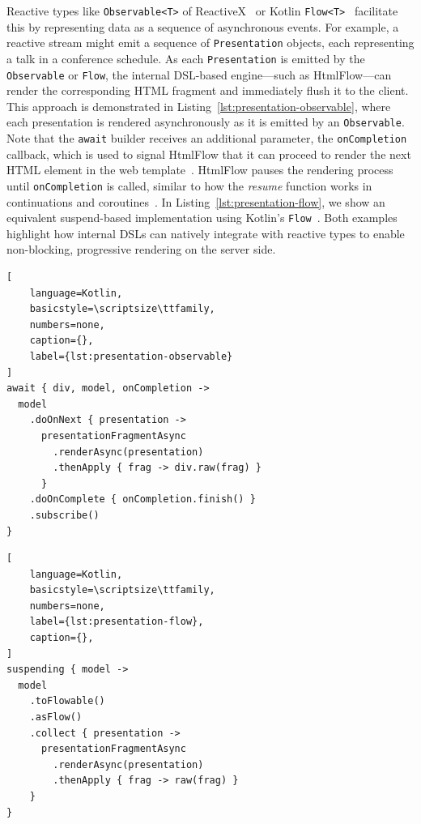 \documentclass[software,article,accept,pdftex,moreauthors]{Definitions/mdpi}
\begin{document}
Reactive types like \texttt{Observable<T>} of ReactiveX~\cite{rxjava} or Kotlin \texttt{Flow<T>}~\cite{kotlinlang}
facilitate this by representing data as a sequence of asynchronous events.
For example, a reactive stream might emit a sequence of \texttt{Presentation}
objects, each representing a talk in a conference schedule.
As each \texttt{Presentation} is emitted by the \texttt{Observable}
or \texttt{Flow}, the internal DSL-based engine---such as HtmlFlow---can render the
corresponding HTML fragment and immediately flush it to the client. This
approach is demonstrated in Listing~\ref{lst:presentation-observable}, where each
presentation is rendered asynchronously as it is emitted by an
\texttt{Observable}.
Note that the \texttt{await} builder receives an additional parameter, the
\texttt{onCompletion} callback, which is used to signal HtmlFlow that it can
proceed to render the next HTML element in the web
template~\cite{carvalho2023async}.
HtmlFlow pauses the rendering process until \texttt{onCompletion} is called,
similar to how the \emph{resume} function works in continuations and
coroutines~\cite{coroutines_continuations}.
In Listing~\ref{lst:presentation-flow}, we show an
equivalent suspend-based implementation using Kotlin's \texttt{Flow}~\cite{wise2024pssr}.
Both examples highlight how internal DSLs can natively integrate with reactive types
to enable non-blocking, progressive rendering on the server side.

\begin{listing}[H]
\caption{\textit{HtmlFlow reactive} presentation template in Kotlin with an \texttt{Observable} model.}
\begin{lstlisting}[
    language=Kotlin,
    basicstyle=\scriptsize\ttfamily,
    numbers=none,
    caption={},
    label={lst:presentation-observable}
]
await { div, model, onCompletion ->
  model
    .doOnNext { presentation ->
      presentationFragmentAsync
        .renderAsync(presentation)
        .thenApply { frag -> div.raw(frag) }
      }
    .doOnComplete { onCompletion.finish() }
    .subscribe()
}
\end{lstlisting}
\end{listing}

\vspace{-12pt}
\begin{listing}[H]
\caption{\textit{HtmlFlow suspend} presentation template in Kotlin with a \texttt{Flow} model.}
\begin{lstlisting}[
    language=Kotlin,
    basicstyle=\scriptsize\ttfamily,
    numbers=none,
    label={lst:presentation-flow},
    caption={},
]
suspending { model ->
  model
    .toFlowable()
    .asFlow()
    .collect { presentation ->
      presentationFragmentAsync
        .renderAsync(presentation)
        .thenApply { frag -> raw(frag) }
    }
}
\end{lstlisting}
\end{listing}
\end{document}
